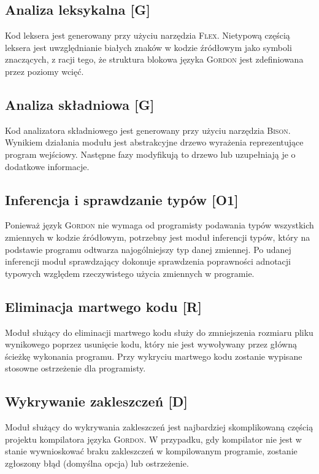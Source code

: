 \documentclass{documentation}
\begin{document}
\subsection{Analiza leksykalna [G]}
\noindent Kod leksera jest generowany przy użyciu narzędzia \textsc{Flex}. Nietypową
częścią leksera jest uwzględnianie białych znaków w kodzie źródłowym jako symboli znaczących,
z racji tego, że struktura blokowa języka \textsc{Gordon} jest zdefiniowana przez poziomy wcięć.

\subsection{Analiza składniowa [G]}
\noindent Kod analizatora składniowego jest generowany przy użyciu narzędzia \textsc{Bison}.
Wynikiem działania modułu jest abstrakcyjne drzewo wyrażenia reprezentujące program wejściowy.
Następne fazy modyfikują to drzewo lub uzupełniają je o dodatkowe informacje.

\subsection{Inferencja i sprawdzanie typów [O1]}
\noindent Ponieważ język \textsc{Gordon} nie wymaga od programisty podawania typów wszystkich
zmiennych w kodzie źródłowym, potrzebny jest moduł inferencji typów, który na podstawie
programu odtwarza najogólniejszy typ danej zmiennej. Po udanej inferencji moduł sprawdzający
dokonuje sprawdzenia poprawności adnotacji typowych względem rzeczywistego użycia zmiennych
w programie.

\subsection{Eliminacja martwego kodu [R]}
\noindent Moduł służący do eliminacji martwego kodu służy do zmniejszenia rozmiaru pliku wynikowego
poprzez usunięcie kodu, który nie jest wywoływany przez główną ścieżkę wykonania programu.
Przy wykryciu martwego kodu zostanie wypisane stosowne ostrzeżenie dla programisty.

\subsection{Wykrywanie zakleszczeń [D]}
\noindent Moduł służący do wykrywania zakleszczeń jest najbardziej skomplikowaną częścią projektu
kompilatora języka \textsc{Gordon}. W przypadku, gdy kompilator nie jest w stanie wywnioskować
braku zakleszczeń w kompilowanym programie, zostanie zgłoszony błąd (domyślna opcja)
lub ostrzeżenie.
\end{document}
